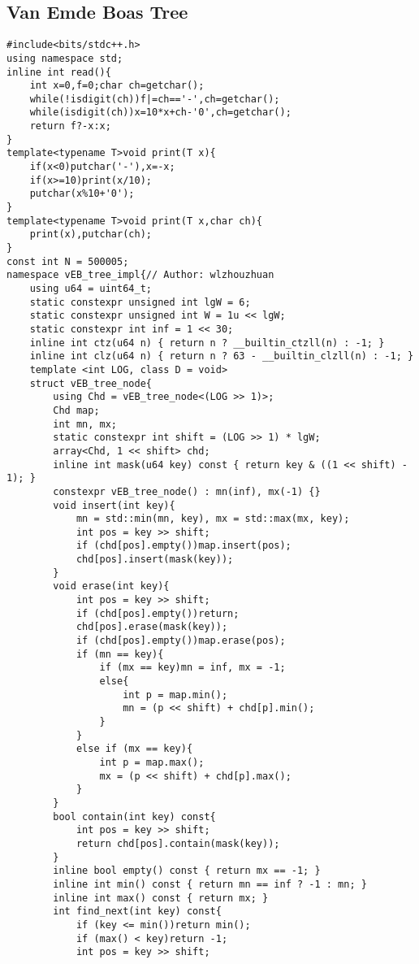 \documentclass[landscape, 8pt, a4paper, oneside, twocolumn]{extarticle}
\begin{document}
\subsection {Van Emde Boas Tree}
\begin{verbatim}
#include<bits/stdc++.h>
using namespace std;
inline int read(){
    int x=0,f=0;char ch=getchar();
    while(!isdigit(ch))f|=ch=='-',ch=getchar();
    while(isdigit(ch))x=10*x+ch-'0',ch=getchar();
    return f?-x:x;
}
template<typename T>void print(T x){
    if(x<0)putchar('-'),x=-x;
    if(x>=10)print(x/10);
    putchar(x%10+'0');
}
template<typename T>void print(T x,char ch){
    print(x),putchar(ch);
}
const int N = 500005;
namespace vEB_tree_impl{// Author: wlzhouzhuan
    using u64 = uint64_t;
    static constexpr unsigned int lgW = 6;
    static constexpr unsigned int W = 1u << lgW;
    static constexpr int inf = 1 << 30;
    inline int ctz(u64 n) { return n ? __builtin_ctzll(n) : -1; }
    inline int clz(u64 n) { return n ? 63 - __builtin_clzll(n) : -1; }
    template <int LOG, class D = void>
    struct vEB_tree_node{
        using Chd = vEB_tree_node<(LOG >> 1)>;
        Chd map;
        int mn, mx;
        static constexpr int shift = (LOG >> 1) * lgW;
        array<Chd, 1 << shift> chd;
        inline int mask(u64 key) const { return key & ((1 << shift) - 1); }
        constexpr vEB_tree_node() : mn(inf), mx(-1) {}
        void insert(int key){
            mn = std::min(mn, key), mx = std::max(mx, key);
            int pos = key >> shift;
            if (chd[pos].empty())map.insert(pos);
            chd[pos].insert(mask(key));
        }
        void erase(int key){
            int pos = key >> shift;
            if (chd[pos].empty())return;
            chd[pos].erase(mask(key));
            if (chd[pos].empty())map.erase(pos);
            if (mn == key){
                if (mx == key)mn = inf, mx = -1;
                else{
                    int p = map.min();
                    mn = (p << shift) + chd[p].min();
                }
            }
            else if (mx == key){
                int p = map.max();
                mx = (p << shift) + chd[p].max();
            }
        }
        bool contain(int key) const{
            int pos = key >> shift;
            return chd[pos].contain(mask(key));
        }
        inline bool empty() const { return mx == -1; }
        inline int min() const { return mn == inf ? -1 : mn; }
        inline int max() const { return mx; }
        int find_next(int key) const{
            if (key <= min())return min();
            if (max() < key)return -1;
            int pos = key >> shift;

\end{verbatim}
\end{document}
